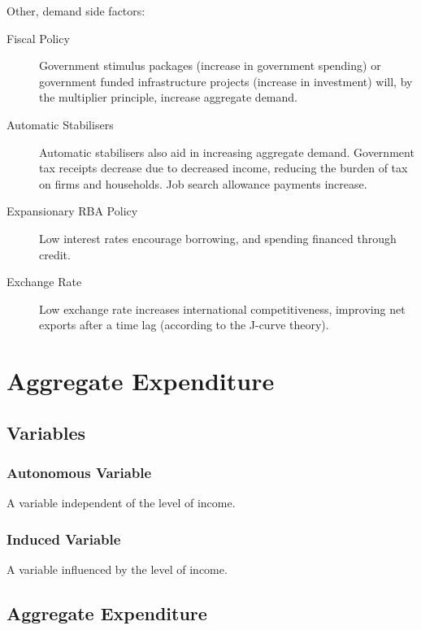 \documentclass[a4paper,11pt]{report}
\begin{document}
Other, demand side factors:

\begin{description}
\item [Fiscal Policy] Government stimulus packages (increase in government
	spending) or government funded infrastructure projects (increase in
	investment) will, by the multiplier principle, increase aggregate demand.
\item [Automatic Stabilisers] Automatic stabilisers also aid in increasing
	aggregate demand. Government tax receipts decrease due to decreased income,
	reducing the burden of tax on firms and households. Job search allowance
	payments increase.
\item [Expansionary RBA Policy] Low interest rates encourage borrowing, and
	spending financed through credit.
\item [Exchange Rate] Low exchange rate increases international competitiveness,
	improving net exports after a time lag (according to the J-curve theory).
\end{description}




\chapter{Aggregate Expenditure}

\section{Variables}

\subsection{Autonomous Variable}

A variable independent of the level of income.


\subsection{Induced Variable}

A variable influenced by the level of income.



\section{Aggregate Expenditure}
\end{document}
